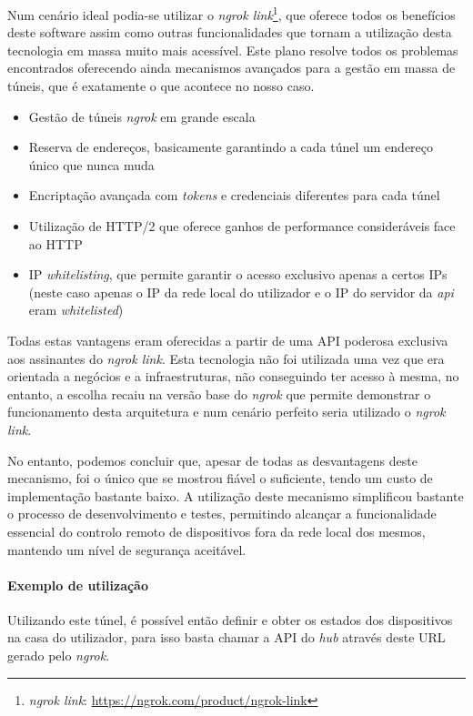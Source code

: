 Num cenário ideal podia-se utilizar o \textit{ngrok link}\footnote{\textit{ngrok link}: \url{https://ngrok.com/product/ngrok-link}}, que oferece todos os benefícios deste software assim como outras funcionalidades que tornam a utilização desta tecnologia em massa muito mais acessível. Este plano resolve todos os problemas encontrados oferecendo ainda mecanismos avançados para a gestão em massa de túneis, que é exatamente o que acontece no nosso caso.
\begin{itemize}
    \item Gestão de túneis \textit{ngrok} em grande escala
    \item Reserva de endereços, basicamente garantindo a cada túnel um endereço único que nunca muda
    \item Encriptação avançada com \textit{tokens} e credenciais diferentes para cada túnel
    \item Utilização de HTTP/2 que oferece ganhos de performance consideráveis face ao HTTP
    \item IP \textit{whitelisting}, que permite garantir o acesso exclusivo apenas a certos IPs (neste caso apenas o IP da rede local do utilizador e o IP do servidor da \textit{api} eram \textit{whitelisted})
\end{itemize}

Todas estas vantagens eram oferecidas a partir de uma API poderosa exclusiva aos assinantes do \textit{ngrok link}. Esta tecnologia não foi utilizada uma vez que era orientada a negócios e a infraestruturas, não conseguindo ter acesso à mesma, no entanto, a escolha recaiu na versão base do \textit{ngrok} que permite demonstrar o funcionamento desta arquitetura e num cenário perfeito seria utilizado o \textit{ngrok link}.

No entanto, podemos concluir que, apesar de todas as desvantagens deste mecanismo, foi o único que se mostrou fiável o suficiente, tendo um custo de implementação bastante baixo. A utilização deste mecanismo simplificou bastante o processo de desenvolvimento e testes, permitindo alcançar a funcionalidade essencial do controlo remoto de dispositivos fora da rede local dos mesmos, mantendo um nível de segurança aceitável.

\paragraph*{Exemplo de utilização}

Utilizando este túnel, é possível então definir e obter os estados dos dispositivos na casa do utilizador, para isso basta chamar a API do \textit{hub} através deste URL gerado pelo \textit{ngrok}.

